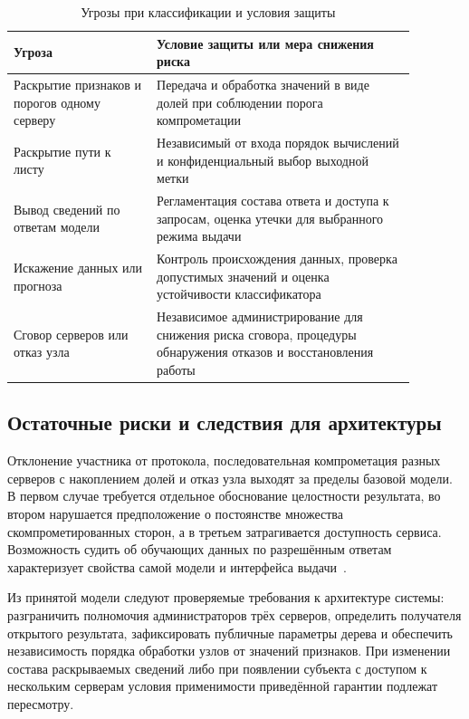 \begin{table}[htbp]
    \caption{Угрозы при классификации и условия защиты}
    \label{tab:threat-map}
    \centering
    \small
    \begin{tabular}{|p{0.31\linewidth}|p{0.57\linewidth}|}
        \hline
        Угроза & Условие защиты или мера снижения риска \\ \hline
        Раскрытие признаков и порогов одному серверу &
        Передача и обработка значений в виде долей при соблюдении
        порога компрометации \\ \hline
        Раскрытие пути к листу &
        Независимый от входа порядок вычислений и конфиденциальный
        выбор выходной метки \\ \hline
        Вывод сведений по ответам модели &
        Регламентация состава ответа и доступа к запросам,
        оценка утечки для выбранного режима выдачи \\ \hline
        Искажение данных или прогноза &
        Контроль происхождения данных, проверка допустимых значений
        и оценка устойчивости классификатора \\ \hline
        Сговор серверов или отказ узла &
        Независимое администрирование для снижения риска сговора,
        процедуры обнаружения отказов и восстановления работы \\ \hline
    \end{tabular}
\end{table}

\subsection{Остаточные риски и следствия для архитектуры}

Отклонение участника от протокола, последовательная компрометация разных
серверов с накоплением долей и отказ узла выходят за пределы базовой
модели. В первом случае требуется отдельное обоснование целостности
результата, во втором нарушается предположение о постоянстве множества
скомпрометированных сторон, а в третьем затрагивается доступность сервиса.
Возможность судить об обучающих данных по разрешённым ответам характеризует
свойства самой модели и интерфейса выдачи~\cite{papernot2018sok,shokri2017mia}.

Из принятой модели следуют проверяемые требования к архитектуре системы:
разграничить полномочия администраторов трёх серверов, определить
получателя открытого результата, зафиксировать публичные параметры
дерева и обеспечить независимость порядка обработки узлов от значений
признаков. При изменении состава раскрываемых сведений либо при появлении
субъекта с доступом к нескольким серверам условия применимости приведённой
гарантии подлежат пересмотру.
